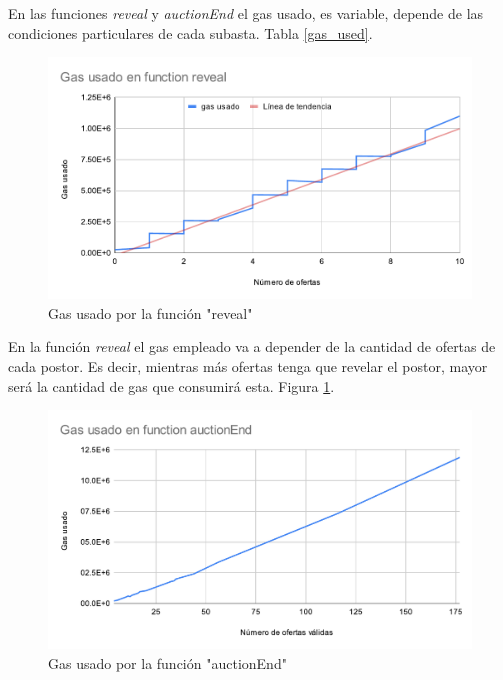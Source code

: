       En las funciones \textit{reveal} y \textit{auctionEnd} el gas usado, es variable, depende de las
      condiciones particulares de cada subasta. Tabla \ref{gas_used}.


      \begin{figure}
        \centering
        \includegraphics[scale=0.9]{Graphics/gas_reveal.pdf}
        \caption{Gas usado por la función "reveal"}
        \label{gas_reveal}
      \end{figure} 
  
      En la función \textit{reveal} el gas empleado va a depender de la cantidad de ofertas de cada postor.
      Es decir, mientras más ofertas tenga que revelar el postor, mayor será la cantidad de gas que
      consumirá esta. Figura \ref{gas_reveal}.


      \begin{figure}
        \centering
        \includegraphics[scale=0.9]{Graphics/gas_auctionEnd.pdf}
        \caption{Gas usado por la función "auctionEnd"}
        \label{gas_auctionEnd}
      \end{figure} 
  
